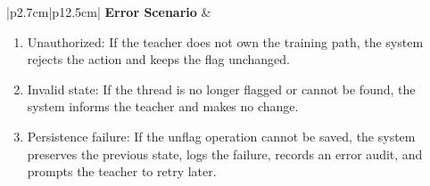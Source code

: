 \begin{table}[H]
\begin{tabular}{|p{2.7cm}|p{12.5cm}|}
        \textbf{Error Scenario} & \begin{minipage}[t]{\linewidth}
            \begin{enumerate}[topsep=0pt,itemsep=1pt,parsep=0pt,partopsep=0pt]
                \item Unauthorized: If the teacher does not own the training path, the system rejects the action and keeps the flag unchanged.
                \item Invalid state: If the thread is no longer flagged or cannot be found, the system informs the teacher and makes no change.
                \item Persistence failure: If the unflag operation cannot be saved, the system preserves the previous state, logs the failure, records an error audit, and prompts the teacher to retry later.
            \end{enumerate}
        \end{minipage} \\ \hline
    \end{tabular}
    \label{tab:teacher-resolve-flag}
\end{table}
\fi


